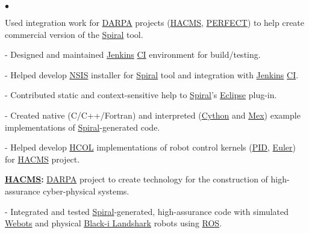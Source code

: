 \documentclass{article}
\newcommand{\lineunder}{\vspace*{-8pt} \\ \hspace*{-18pt} \hrulefill \\}
\newcommand{\header}[1]{{\hspace*{-15pt}\vspace*{6pt} \textsc{#1}} \vspace*{-6pt} \lineunder}
\newenvironment{achievements}{\begin{list}{$\bullet$}{\topsep 0pt \itemsep -2pt}}{\vspace*{4pt}\end{list}}
\begin{document}
\begin{achievements}

\item Used integration work for \href{http://www.darpa.mil/default.aspx}{DARPA} projects (\href{http://www.darpa.mil/Our_Work/I2O/Programs/High-Assurance_Cyber_Military_Systems_(HACMS).aspx}{HACMS}, \href{http://www.darpa.mil/Our_Work/MTO/Programs/Power_Efficiency_Revolution_for_Embedded_Computing_Technologies_(PERFECT).aspx}{PERFECT}) to help create commercial version of the \href{http://spiral.net/}{Spiral} tool. 

- Designed and maintained \href{http://jenkins-ci.org/}{Jenkins} 
\href{http://en.wikipedia.org/wiki/Continuous_integration}{CI}  
environment for build/testing.

- Helped develop \href{http://nsis.sourceforge.net/Main_Page}{NSIS} installer for \href{http://spiral.net/}{Spiral} tool and integration with \href{http://jenkins-ci.org/}{Jenkins} 
\href{http://en.wikipedia.org/wiki/Continuous_integration}{CI}.

- Contributed static and context-sensitive help to \href{http://spiral.net/}{Spiral}'s 
\href{http://www.eclipse.org/}{Eclipse} plug-in.

- Created  native (C/C++/Fortran) and interpreted (\href{http://cython.org/}{Cython} and \href{http://www.mathworks.com/help/matlab/ref/mex.html}{Mex}) example implementations of \href{http://spiral.net/}{Spiral}-generated code. 

- Helped develop \href{https://wiki.hh.se/wg211/images/e/e0/M13Franchetti.pdf}{HCOL} implementations of robot control 
kernels (\href{http://en.wikipedia.org/wiki/PID_controller}{PID}, 
\href{http://en.wikipedia.org/wiki/Euler_method}{Euler}) for \href{http://www.darpa.mil/Our_Work/I2O/Programs/High-Assurance_Cyber_Military_Systems_(HACMS).aspx}{HACMS} project.  

\item \textbf{\href{http://www.darpa.mil/Our_Work/I2O/Programs/High-Assurance_Cyber_Military_Systems_(HACMS).aspx}{HACMS}:}
\href{http://www.darpa.mil/default.aspx}{DARPA} project to create technology for the construction of high-assurance cyber-physical systems. 

- Integrated and tested \href{http://spiral.net/}{Spiral}-generated, high-assurance code with simulated \href{http://www.cyberbotics.com/}{Webots} and physical \href{http://www.blackirobotics.com/}{Black-i Landshark} robots using \href{http://www.ros.org/}{ROS}. 


\end{achievements}
\end{document}

